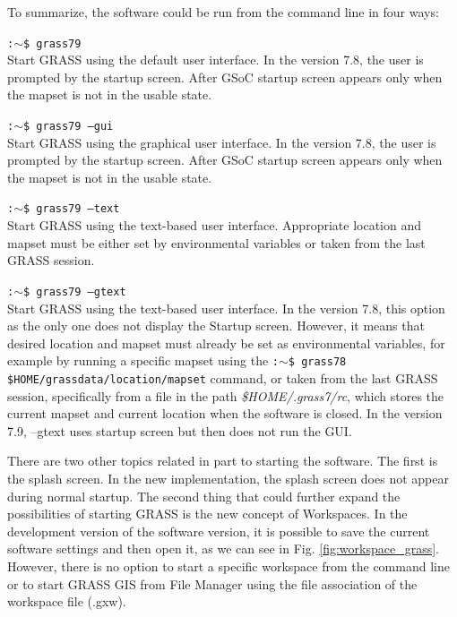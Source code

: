 \documentclass[a4paper,10pt,twoside]{article}
\begin{document}
 \noindent To summarize, the software could be run from the command line in four ways:

\noindent \texttt{:$\sim$\$ grass79} \\
\noindent Start GRASS using the default user interface. In the version 7.8, the user is prompted by the startup screen. After GSoC startup screen appears only when the mapset is not in the usable state.

\noindent \texttt{:$\sim$\$ grass79 --gui}\\
\noindent Start GRASS using the graphical user interface.  In the version 7.8, the user is prompted by the startup screen. After GSoC startup screen appears only when the mapset is not in the usable state.

\noindent \texttt{:$\sim$\$ grass79 --text} \\
\noindent Start GRASS using the text-based user interface. Appropriate location and mapset must be either set by environmental variables or taken from the last GRASS session.

\noindent \texttt{:$\sim$\$ grass79 --gtext} \\
\noindent Start GRASS using the text-based user interface.  In the version 7.8, this option as the only one does not display the Startup screen. However, it means that desired location and mapset must already be set as environmental variables, for example by running a specific mapset using the \texttt{:$\sim$\$ grass78 \$HOME/grassdata/location/mapset} command, or taken from the last GRASS session, specifically from a file in the path \textit{\$HOME/.grass7/rc}, which stores the current mapset and current location when the software is closed.
In the version 7.9, --gtext uses startup screen but then does not run the GUI.

There are two other topics related in part to starting the software. The first is the splash screen. In the new implementation, the splash screen does not appear during normal startup. The second thing that could further expand the possibilities of starting GRASS is the new concept of Workspaces. In the development version of the software version, it is possible to save the current software settings and then open it, as we can see in Fig. \ref {fig:workspace_grass}. However, there is no option to start a specific workspace from the command line or to start GRASS GIS from File Manager using the file association of the workspace file (.gxw).
\end{document}
